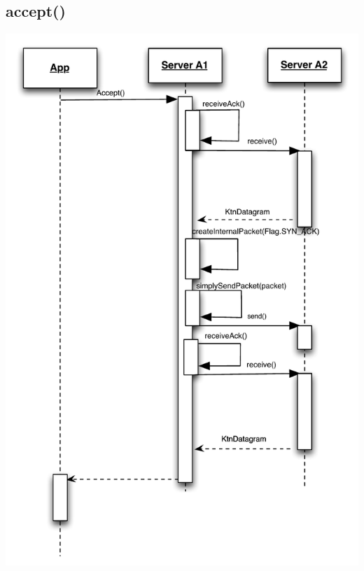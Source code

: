 \documentclass{article}
\begin{document}
\subsection{accept()}
\includegraphics[scale=0.95]{ktnAccept.pdf}
\end{document}
